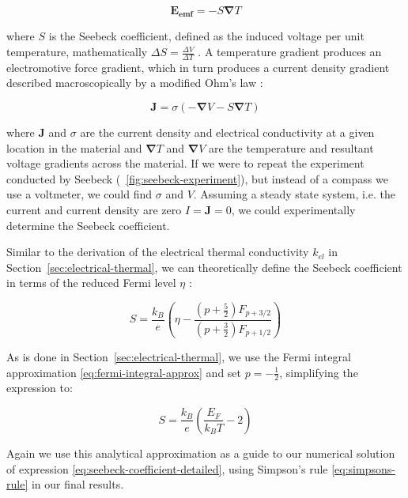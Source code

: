 \documentclass[12pt]{article}
\newcommand{\figref}[2][\figurename~]{#1\ref{#2}}
\newcommand{\secref}[2][Section~]{#1\ref{#2}}
\renewcommand{\vec}[1]{\mathbf{#1}}
\begin{document}
\begin{equation}
\label{seebeck-emf}
	\vec{E_{emf}} = -S \vec{\nabla} T
\end{equation}

where $S$ is the Seebeck coefficient, defined as the induced voltage per unit temperature, mathematically $\Delta S = \frac{\Delta V}{\Delta T}$ \cite{modern-thermoelectrics}. A temperature gradient produces an electromotive force gradient, which in turn produces a current density gradient described macroscopically by a modified Ohm's law \cite{kittel}:

\begin{equation}
\label{current-density}
	\vec{J} = \sigma (-\vec{\nabla} V - S \vec{\nabla} T)
\end{equation}

where $\vec{J}$ and $\sigma$ are the current density and electrical conductivity at a given location in the material and $\vec{\nabla} T$ and $\vec{\nabla} V$ are the temperature and resultant voltage gradients across the material. If we were to repeat the experiment conducted by Seebeck (\figref{fig:seebeck-experiment}), but instead of a compass we use a voltmeter, we could find $\sigma$ and $V$. Assuming a steady state system, i.e. the current and current density are zero $I = \vec{J} = 0$, we could experimentally determine the Seebeck coefficient.

Similar to the derivation of the electrical thermal conductivity $k_{el}$ in \secref{sec:electrical-thermal}, we can theoretically define the Seebeck coefficient in terms of the reduced Fermi level $\eta$ \cite{drabble}:

\begin{equation}
\label{eq:seebeck-coefficient-detailed}
	S = \frac{k_B}{e}\left(\eta - \frac{(p+\frac{5}{2})F_{p+3/2}}{(p+\frac{3}{2})F_{p+1/2}}\right)
\end{equation}

As is done in \secref{sec:electrical-thermal}, we use the Fermi integral approximation \eqref{eq:fermi-integral-approx} and set $p = -\frac{1}{2}$, simplifying the expression to:

\begin{equation}
\label{eq:seebeck-coefficient}
	S = \frac{k_B}{e} \left(\frac{E_F}{k_B T} - 2 \right)
\end{equation}

Again we use this analytical approximation as a guide to our numerical solution of expression \eqref{eq:seebeck-coefficient-detailed}, using Simpson's rule \eqref{eq:simpsons-rule} in our final results.
\end{document}
